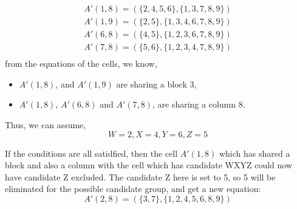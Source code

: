 \documentclass[11pt]{report}
\newcommand{\set}[1]{\{ #1 \}}
\begin{document}
\begin{eqnarray*}
A'(1,8) = (\set{2, 4, 5, 6}, \set{1, 3, 7, 8, 9})\\
A'(1,9) = (\set{2, 5}, \set{1, 3, 4, 6, 7, 8, 9})\\
A'(6,8) = (\set{4, 5}, \set{1, 2, 3, 6, 7, 8 ,9})\\
A'(7,8) = (\set{5, 6}, \set{1, 2, 3, 4, 7, 8 ,9})\\
\end{eqnarray*}
from the equations of the cells, we know,
\begin{itemize}
\item $A'(1,8)$, and $A'(1,9)$ are sharing a block 3,
\item $A'(1,8)$, $A'(6,8)$ and $A'(7,8)$, are sharing a column 8.
\end{itemize}
Thus, we can assume,
\begin{displaymath}
W= 2, X = 4, Y = 6, Z = 5
\end{displaymath}

If the conditions are all satidfied, then the cell $A'(1,8)$ which has shared a block and also a column with the cell which has candidate WXYZ could now have candidate Z excluded. The candidate Z here is set to 5, so 5 will be eliminated for the possible candidate group, and get a new equation:
\begin{displaymath}
A'(2,8) = (\set{3, 7}, \set{1, 2, 4, 5, 6, 8 ,9})
\end{displaymath}
\end{document}
